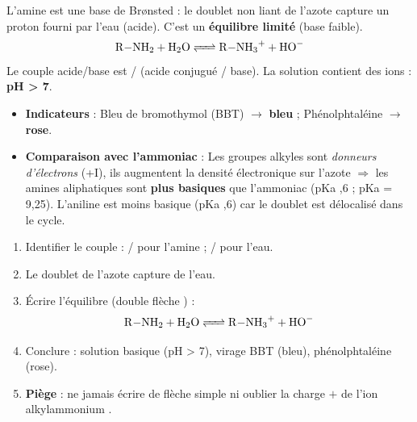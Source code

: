 \documentclass[11pt]{article}
\newcommand{\cle}[1]{{\popxbold\color{popdark}#1}}
\begin{document}
\begin{propriete}
L'amine est une \cle{base de Brønsted} : le doublet non liant de l'azote capture un proton  fourni par l'eau (acide). C'est un \textbf{équilibre limité} (base faible).
\[ \ce{R-NH2 + H2O <=> R-NH3+ + HO-} \]
Le couple acide/base est / (acide conjugué / base). La solution contient des ions  : \textbf{pH > 7}.
\begin{itemize}
\item \textbf{Indicateurs} : Bleu de bromothymol (BBT) $\to$ \textbf{bleu} ; Phénolphtaléine $\to$ \textbf{rose}.
\item \textbf{Comparaison avec l'ammoniac} : Les groupes alkyles sont \emph{donneurs d'électrons} (+I), ils augmentent la densité électronique sur l'azote $\Rightarrow$ les amines aliphatiques sont \textbf{plus basiques} que l'ammoniac (pKa  ,6 ; pKa  = 9,25). L'aniline est moins basique (pKa ,6) car le doublet est délocalisé dans le cycle.
\end{itemize}
\end{propriete}

\begin{methode}
\begin{enumerate}
\item Identifier le couple : / pour l'amine ; / pour l'eau.
\item Le doublet de l'azote capture  de l'eau.
\item Écrire l'équilibre (double flèche \ce{<=>}) :
\[ \ce{R-NH2 + H2O <=> R-NH3+ + HO-} \]
\item Conclure : solution basique (pH > 7), virage BBT (bleu), phénolphtaléine (rose).
\item \textbf{Piège} : ne jamais écrire de flèche simple \ce{->} ni oublier la charge $+$ de l'ion alkylammonium .
\end{enumerate}
\end{methode}
\end{document}
